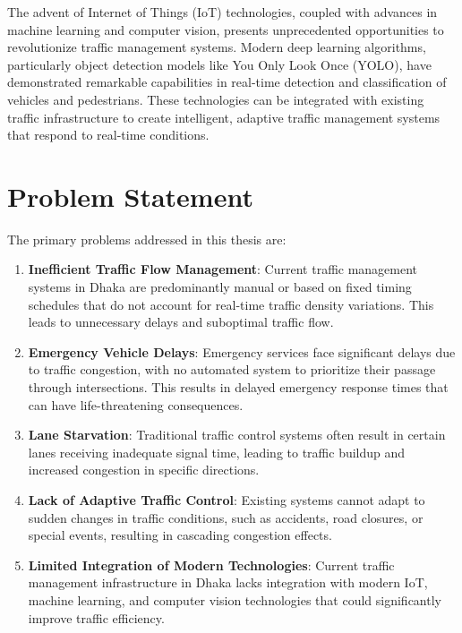 The advent of Internet of Things (IoT) technologies, coupled with advances in machine learning and computer vision, presents unprecedented opportunities to revolutionize traffic management systems. Modern deep learning algorithms, particularly object detection models like You Only Look Once (YOLO), have demonstrated remarkable capabilities in real-time detection and classification of vehicles and pedestrians. These technologies can be integrated with existing traffic infrastructure to create intelligent, adaptive traffic management systems that respond to real-time conditions.

\section{Problem Statement}

The primary problems addressed in this thesis are:

\begin{enumerate}
    \item \textbf{Inefficient Traffic Flow Management}: Current traffic management systems in Dhaka are predominantly manual or based on fixed timing schedules that do not account for real-time traffic density variations. This leads to unnecessary delays and suboptimal traffic flow.
    
    \item \textbf{Emergency Vehicle Delays}: Emergency services face significant delays due to traffic congestion, with no automated system to prioritize their passage through intersections. This results in delayed emergency response times that can have life-threatening consequences.
    
    \item \textbf{Lane Starvation}: Traditional traffic control systems often result in certain lanes receiving inadequate signal time, leading to traffic buildup and increased congestion in specific directions.
    
    \item \textbf{Lack of Adaptive Traffic Control}: Existing systems cannot adapt to sudden changes in traffic conditions, such as accidents, road closures, or special events, resulting in cascading congestion effects.
    
    \item \textbf{Limited Integration of Modern Technologies}: Current traffic management infrastructure in Dhaka lacks integration with modern IoT, machine learning, and computer vision technologies that could significantly improve traffic efficiency.
\end{enumerate}

